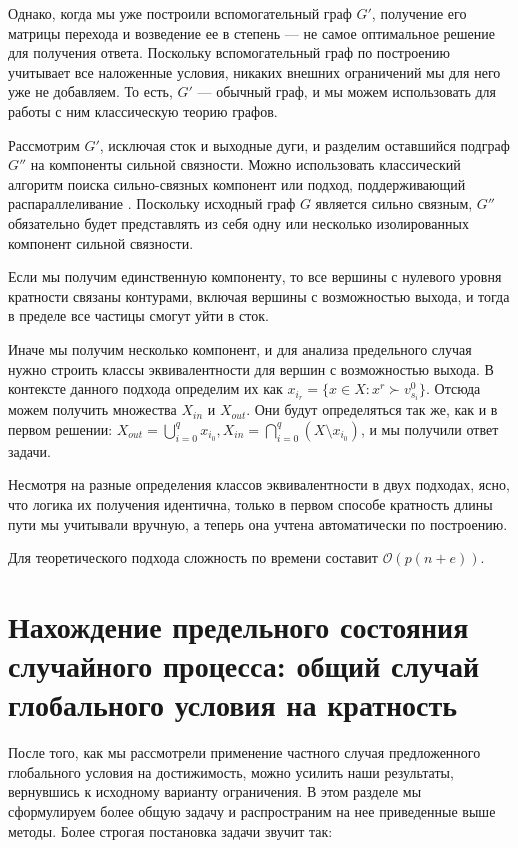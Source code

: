 Однако, когда мы уже построили вспомогательный граф $G'$, получение его матрицы перехода и возведение ее в степень --- не самое оптимальное решение для получения ответа. Поскольку вспомогательный граф по построению учитывает все наложенные условия, никаких внешних ограничений мы для него уже не добавляем. То есть, $G'$ --- обычный граф, и мы можем использовать для работы с ним классическую теорию графов. 

Рассмотрим $G'$, исключая сток и выходные дуги, и разделим оставшийся подграф $G''$ на компоненты сильной связности. Можно использовать классический алгоритм поиска сильно-связных компонент \cite{Tar} или подход, поддерживающий распараллеливание \cite{Par2}.
Поскольку исходный граф $G$ является сильно связным, $G''$ обязательно будет представлять из себя одну или несколько изолированных компонент сильной связности. %

Если мы получим единственную компоненту, то все вершины с нулевого уровня кратности связаны контурами, включая вершины с возможностью выхода, и тогда в пределе все частицы смогут уйти в сток. 

Иначе мы получим несколько компонент, и для анализа предельного случая нужно строить классы эквивалентности для вершин с возможностью выхода. В контексте данного подхода определим их как $x_{i_r} = \{x \in X: x^r \succ v^0_{s_i} \}$. Отсюда можем получить множества $X_{in}$ и $X_{out}$. Они будут определяться так же, как и в первом решении: $X_{out} = \bigcup\limits_{i=0}^q x_{i_0}, X_{in} = \bigcap\limits_{i=0}^q (X \setminus x_{i_0})$, и мы получили ответ задачи. 

Несмотря на разные определения классов эквивалентности в двух подходах, ясно, что логика их получения идентична, только в первом способе кратность длины пути мы учитывали вручную, а теперь она учтена автоматически по построению. 

Для теоретического подхода сложность по времени составит  $\mathcal{O}(p(n + e))$.


\section{Нахождение предельного состояния случайного процесса: общий случай глобального условия на кратность}

После того, как мы рассмотрели применение частного случая предложенного глобального условия на достижимость, можно усилить наши результаты, вернувшись к исходному варианту ограничения. В этом разделе мы сформулируем более общую задачу и распространим на нее приведенные выше методы. Более строгая постановка задачи звучит так: 	

